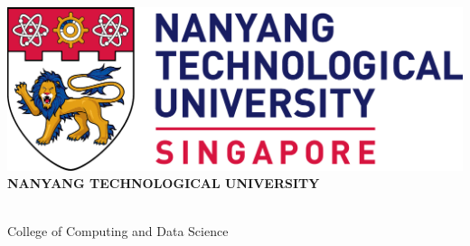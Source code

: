 \makeatletter
\begin{titlepage}
\begin{center}

\includegraphics[width=\textwidth]{figures/ntu_logo.png}
\\[2cm]

\uppercase{\textbf{\large{Nanyang Technological University}}}
\\[7cm]

\uppercase{\textbf{\large{\@title}}}

\vfill
\@author
\\[3cm]

College of Computing and Data Science

\@date

\end{center}
\end{titlepage}
\makeatother

